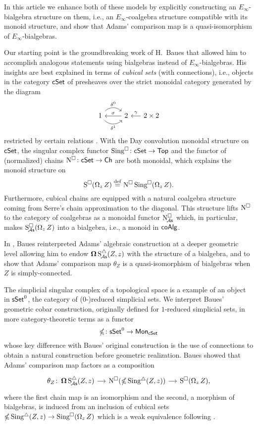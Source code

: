 In this article we enhance both of these models by explicitly constructing an $E_\infty$-bialgebra structure on them, i.e., an $E_\infty$-coalgebra structure compatible with its monoid structure, and show that Adams' comparison map is a quasi-isomorphism of $E_\infty$-bialgebras.

Our starting point is the groundbreaking work of H.~Baues that allowed him to accomplish analogous statements using bialgebras instead of $E_\infty$-bialgebras.
His insights are best explained in terms of \textit{cubical sets} (with connections), i.e., objects in the category $\mathsf{cSet}$ of presheaves over the strict monoidal category generated by the diagram
\[
\begin{tikzcd}
1 \arrow[r, out=45, in=135, "\delta^0"] \arrow[r, out=-45, in=-135, "\delta^1"'] & 2 \arrow[l, "\sigma"'] &[-10pt] \arrow[l, "\gamma"'] 2 \times 2
\end{tikzcd}
\]
restricted by certain relations \cite{brown1981cubes}.
With the Day convolution monoidal structure on $\mathsf{cSet}$, the singular complex functor $\operatorname{Sing^{\square}} \colon \mathsf{cSet} \to \mathsf{Top}$ and the functor of (normalized) chains $\operatorname{N^{\square}} \colon \mathsf{cSet} \to \mathsf{Ch}$ are both monoidal, which explains the monoid structure on
\[
\operatorname{S^{\square}}(\operatorname{\Omega}_z Z) \stackrel{\mathrm{def}}{=} \operatorname{N^{\square}} \operatorname{Sing^{\square}}(\operatorname{\Omega}_z Z).
\]
Furthermore, cubical chains are equipped with a natural coalgebra structure coming from Serre's chain approximation to the diagonal.
This structure lifts $\operatorname{N^{\square}}$ to the category of coalgebras as a monoidal functor $\operatorname{N^{\square}_{\!{\mathcal{A}\mathsf{s}}}}$ which, in particular, makes $\operatorname{S^{\square}_{\!{\mathcal{A}\mathsf{s}}}}(\operatorname{\Omega}_z Z)$ into a bialgebra, i.e., a monoid in $\mathsf{coAlg}$.

In \cite{baues1998hopf}, Baues reinterpreted Adams' algebraic construction at a deeper geometric level allowing him to
endow $\operatorname{\mathbf{\Omega}} \operatorname{S^{\triangle}_{\!{\mathcal{A}\mathsf{s}}}}(Z,z)$ with the structure of a bialgebra, and to show that Adams' comparison map $\theta_Z$ is a quasi-isomorphism of bialgebras when $Z$ is simply-connected.

The simplicial singular complex of a topological space is a example of an object in $\mathsf{sSet}^0$, the category of ($0$-)reduced simplicial sets.
We interpret Baues' geometric cobar construction, originally defined for $1$-reduced simplicial sets, in more category-theoretic terms as a functor
\begin{equation} \label{e:cubical cobar construction}
\operatorname{\mathbb{\Omega}} \colon \mathsf{sSet}^0 \to \mathsf{Mon}_{\mathsf{cSet}}
\end{equation}
whose key difference with Baues' original construction is the use of connections to obtain a natural construction before geometric realization.
Baues showed that Adams' comparison map factors as a composition
\begin{equation} \label{e:baues factorization of adams map}
\begin{tikzcd}[column sep = small]
\theta_Z \colon \cobar \sSchainsA(Z,z) \arrow[r] &
\cchains(\ccobar \sSing(Z,z)) \arrow[r] &
\cSchains(\loops_z Z),
\end{tikzcd}
\end{equation}
where the first chain map is an isomorphism and the second, a morphism of bialgebras, is induced from an inclusion of cubical sets $\operatorname{\mathbb{\Omega}} \operatorname{Sing^{\triangle}}(Z,z) \to \operatorname{Sing^{\square}}(\operatorname{\Omega}_z Z)$ which is a weak equivalence following \cite{rivera2019path}.

